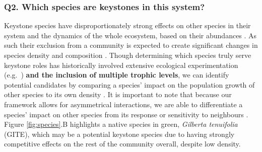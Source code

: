 \documentclass[a4,12pt]{article}
\begin{document}
\begin{refsection}
    \subsubsection*{Q2. Which species are keystones in this system?}
    Keystone species have disproportionately strong effects on other species in their system and the dynamics of the whole ecosystem, based on their abundances \parencite{Power1996, Piraino2002, Libralato2006}. As such their exclusion from a community is expected to create significant changes in species density and composition \parencite{Paine1969}. Though determining which species truly serve keystone roles has historically involved extensive ecological experimentation (e.g.\ \cite{Paine1992}) \textbf{and the inclusion of multiple trophic levels}, we can identify potential candidates by comparing a species' impact on the population growth of other species to its own density \parencite{Libralato2006}. It is important to note that because our framework allows for asymmetrical interactions, we are able to differentiate a species' impact on other species from its response or sensitivity to neighbours \parencite{Broekman2020}. Figure \ref{fig:species}.B highlights a native species in green, \textit{Gilberta tenuifolia} (GITE), which may be a potential keystone species due to having strongly competitive effects on the rest of the community overall, despite low density. 


\end{refsection}
\end{document}
